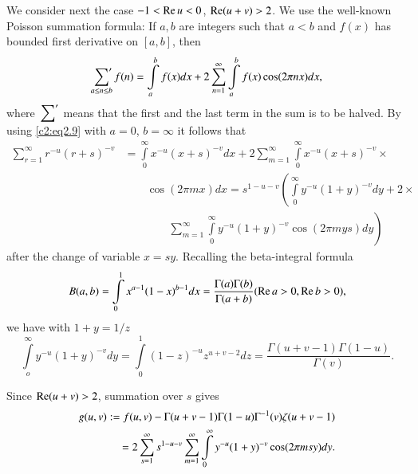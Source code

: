 We consider next the case $-1 < \operatorname{Re} u < 0$, $\operatorname{Re} (u+v)> 2$. We use the
well-known Poisson summation formula: If $a, b$ are integers such that
$a < b$ and $f(x)$ has bounded first derivative on $[a, b]$, then 
\begin{equation}
  \sideset{}{'}\sum_{a \leq n \leq b} f(n) = \int\limits_a^b f(x) dx +
  2 \sum_{n=1}^\infty \int\limits_a^b f(x) \cos (2 \pi n x)dx,\label{c2:eq2.9}
\end{equation}
where $\sideset{}{'}\sum$ means that the first and the last term in
the sum is to be halved. By using \eqref{c2:eq2.9} with $a= 0$, $b=
\infty$ it follows that 
\begin{align*}
  \sum^\infty_{r=1} r^{-u} (r+s)^{-v} &= \int\limits_0^\infty x^{-u}
  (x+s)^{-v} dx+ 2 \sum^\infty_{m=1} \int\limits_0^\infty x^{-u}
  (x+s)^{-v}\times\\ 
  &\qquad \cos (2 \pi mx)dx = s^{1- u-v}\left( \int\limits^\infty_0 y^{-u} (1+y)^{-v} dy + 2\times\right.\\
 &\qquad\qquad\left.\sum^\infty_{m=1} \int\limits^\infty_{0} y^{-u} (1+y)^{-v} \cos (2
  \pi m ys) dy\right)
\end{align*}
after the change of variable $x=sy$. Recalling the beta-integral
formula
\begin{equation}
  B(a, b) = \int\limits_0^1 x^{a-1} (1- x)^{b-1} dx = \frac{\Gamma (a)
    \Gamma (b)}{\Gamma (a+b)} (\operatorname{Re} a > 0, \operatorname{Re} b > 0),\label{c2:eq2.10}
\end{equation}
we have with $1+ y = 1/z$
\begin{equation}
  \int\limits_o^\infty y^{-u} (1+y)^{-v} dy = \int\limits_0^1
  (1-z)^{-u} z^{u+v -2} dz = \frac{\Gamma (u+v-1)\Gamma (1-
    u)}{\Gamma (v)}.\label{c2:eq2.11}
\end{equation}

Since $\operatorname{Re} (u+v)> 2$, summation over $s$ gives
\begin{align}
  g (u, v): = f(u, v) - \Gamma (u+v-1) \Gamma (1- u)\Gamma^{-1} (v)
  \zeta (u+ v-1)\notag\\
  = 2 \sum^\infty_{s=1}s^{1- u-v} \sum^\infty_{m=1}
  \int\limits^\infty_0 y^{-u} (1+ y)^{-v} \cos (2 \pi m sy) dy.\label{c2:eq2.12}
\end{align}

